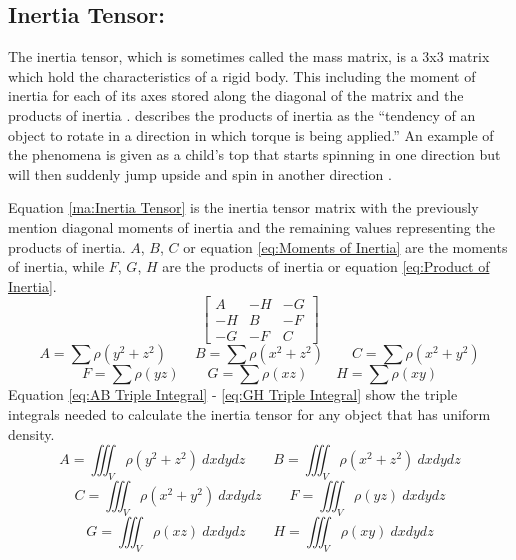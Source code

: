 \subsection{Inertia Tensor:}\label{sc:IT}
The inertia tensor, which is sometimes called the mass matrix, is a 3x3 matrix which hold the characteristics of a rigid body.
This including the moment of inertia for each of its axes stored along the diagonal of the matrix and the products of inertia \citep{millington2007game}.
\citet{millington2007game} describes the products of inertia as the “tendency of an object to rotate in a direction in which torque is being applied.”
An example of the phenomena is given as a child's top that starts spinning in one direction but will then suddenly jump upside and spin in another direction \citep{millington2007game}. 

Equation \ref{ma:Inertia Tensor} is the inertia tensor matrix with the previously mention diagonal moments of inertia and the remaining values representing the products of inertia.
$A$, $B$, $C$ or equation \ref{eq:Moments of Inertia} are the moments of inertia, while $F$, $G$, $H$ are the products of inertia or equation \ref{eq:Product of Inertia}. 
\begin{equation}\label{ma:Inertia Tensor}
\begin{bmatrix}
  A & -H & -G \\
  -H & B & -F \\
  -G & -F & C
\end{bmatrix}
\end{equation}
\begin{equation}\label{eq:Moments of Inertia}
A=\sum\rho\left({y}^{2}+{z}^{2}\right)
\qquad
B=\sum\rho\left({x}^{2}+{z}^{2}\right)
\qquad
C=\sum\rho\left({x}^{2}+{y}^{2}\right)
\end{equation}
\begin{equation}\label{eq:Product of Inertia}
F=\sum\rho\left(yz\right)
\qquad
G=\sum\rho\left(xz\right)
\qquad
H=\sum\rho\left(xy\right)
\end{equation}
Equation \ref{eq:AB Triple Integral} - \ref{eq:GH Triple Integral} show the triple integrals needed to calculate the inertia tensor for any object that has uniform density. 
\begin{equation}\label{eq:AB Triple Integral}
A=\iiint_{V} \rho({y}^{2}+{z}^{2})\  dx dy dz
\qquad
B=\iiint_{V} \rho({x}^{2}+{z}^{2})\ dx dy dz
\end{equation}
\begin{equation}\label{eq:CF Triple Integral}
C=\iiint_{V} \rho({x}^{2}+{y}^{2})\ dx dy dz
\qquad
F=\iiint_{V} \rho(yz)\ dx dy dz
\end{equation}
\begin{equation}\label{eq:GH Triple Integral}
G=\iiint_{V} \rho(xz)\ dx dy dz
\qquad
H=\iiint_{V} \rho(xy)\ dx dy dz
\end{equation}